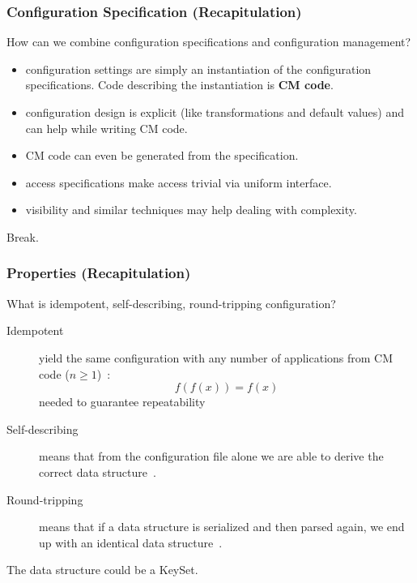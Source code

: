 \begin{frame}
	\frametitle{Configuration Specification (Recapitulation)}

	\begin{task}
	How can we combine configuration specifications and configuration management?
	\end{task}

	\pause

	\begin{itemize} %
	\item configuration settings are simply an instantiation of the configuration specifications.
		Code describing the instantiation is \textbf{CM code}.
	\item configuration design is explicit (like transformations and default values) and can help while writing CM code.
	\item CM code can even be generated from the specification.
	\item access specifications make access trivial via uniform interface.
	\item visibility and similar techniques may help dealing with complexity.
	\end{itemize}
\end{frame}

\begin{assignment}
	\begin{task}
	Break.
	\end{task}
\end{assignment}


\begin{frame}
	\frametitle{Properties (Recapitulation)}

	\begin{task}
	What is idempotent, self-describing, round-tripping configuration?
	\end{task}

	\pause


	\begin{description}
	\item[Idempotent]
	yield the same configuration with any number of applications from CM code ($n\ge1$)~\cite{waldemar2013testing}:
	\[
		f(f(x))=f(x)
	\]
	needed to guarantee repeatability

	\item[Self-describing]
	means that from the configuration file alone we are able to derive the correct data structure~\cite{wadler2003xml}.

	\item[Round-tripping]
	means that if a data structure is serialized and then parsed again, we end up with an identical data structure~\cite{wadler2003xml}.
	\end{description}

	The data structure could be a KeySet.
\end{frame}

